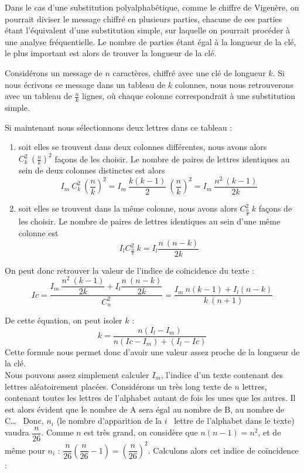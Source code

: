 Dans le cas d'une substitution polyalphabétique, comme le chiffre
de Vigenère, on pourrait diviser le message chiffré en plusieurs
parties, chacune de ces parties étant l'équivalent d'une
substitution simple, sur laquelle on pourrait procéder à une
analyse fréquentielle. Le nombre de parties étant égal à la
longueur de la clé, le plus important est alors de trouver la
longueur de la clé.

Considérons un message de $n$ caractères, chiffré avec une clé de
longueur $k$. Si nous écrivons ce message dans un tableau de $k$
colonnes, nous nous retrouverons avec un tableau de $\frac{n}{k}$
lignes, où chaque colonne correspondrait à une substitution
simple.

Si maintenant nous sélectionnons deux lettres dans ce tableau :
\begin{enumerate}
  \item soit elles se trouvent dans deux colonnes différentes, 
nous avons
alors $C_k^2 ~ (\frac{n}{k})^2$ façons de les choisir. Le nombre
de paires de lettres identiques au sein de deux colonnes distinctes
est alors
\[ I_m ~ C_k^2 ~ \left(\dfrac{n}{k}\right)^2 = 
I_m ~ \dfrac{k (k - 1)}{2} ~
\left(\dfrac{n}{k}\right)^2 = I_m ~ \dfrac{n^2 ~ (k-1)}{2k} \]
  \item soit elles se trouvent dans la même colonne, nous avons
alors $C_{\frac{n}{k}}^2 ~ k $ façons de les choisir. Le nombre de
paires de lettres %
identiques au sein d'une même colonne est
\[ I_l C_{\frac{n}{k}}^2 ~ k = I_l
\dfrac{n ~ (n-k)}{2k} \]
\end{enumerate}

On peut donc retrouver la valeur de l'indice de coïncidence du
texte :
\[Ic = \dfrac{I_m ~ \dfrac{n^2 ~ (k-1)}{2k} +
I_l \dfrac{n ~ (n-k)}{2k}}{C_n^2} =
\dfrac{I_m ~ n (k-1) + I_l (n-k)}{k ~
(n+1)} \]

De cette équation, on peut isoler $k$ :
\[k = \dfrac{n (I_l - I_m)}{n (Ic - I_m) + (I_l - Ic)} \]
Cette formule nous permet donc d'avoir une valeur assez proche de
la longueur de la clé.
\\

Nous pouvons assez simplement calculer $I_m$, l'indice d'un texte
contenant des lettres aléatoirement placées. Considérons un très
long texte de $n$ lettres, contenant toutes les lettres de
l'alphabet autant de fois les unes que les autres.
 Il est alors évident que le nombre de A
sera égal au nombre de B, au nombre de C\dots~
Donc, $n_i$ (le nombre d'apparition de la $i$\ieme~ lettre de
l'alphabet dans le texte) vaudra $\dfrac{n}{26}$.
Comme $n$ est très grand, on considère que $n (n-1) = n^2$, et de
même pour $n_i$ : $\dfrac{n}{26} \left(\dfrac{n}{26} - 1\right) =
\left(\dfrac{n}{26}\right)^2$.
Calculons alors cet indice de coïncidence :

